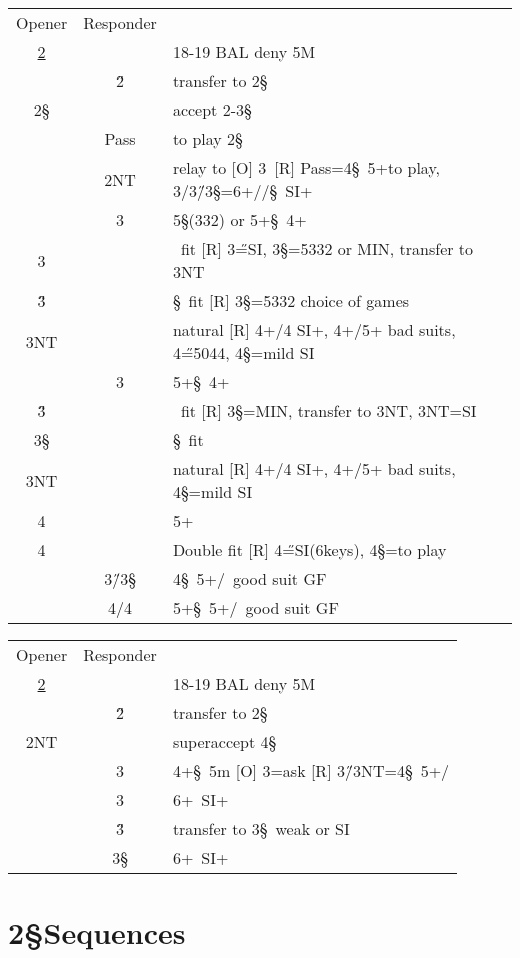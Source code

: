 \hypertarget{2d2h2s}{}
\begin{longtable}{C{\bidlength} C{\bidlength} | l}
Opener & Responder \\
\hyperlink{2d}{2\D} & & 18-19 BAL deny 5M \\
& 2\H & transfer to 2\S \\
2\S & & accept 2-3\S \\
\hline
\hline
& Pass& to play 2\S \\
& 2NT & relay to [O] 3\C\ [R] Pass=4\S\ 5+\C to play, 3\D/3\H/3\S=6+\D/\C/\S\ SI+ \\
& 3\C & 5\S(332) or 5+\S\ 4+\D \\
3\D & & \D\ fit [R] 3\H=SI, 3\S=5332 or MIN, transfer to 3NT \\
3\H & & \S\ fit [R] 3\S=5332 choice of games \\
3NT & & natural [R] 4+/4 SI+, 4+/5+ bad suits, 4\H=5044, 4\S=mild SI \\
& 3\D & 5+\S\ 4+\C \\
3\H & & \C\ fit [R] 3\S=MIN, transfer to 3NT, 3NT=SI \\
3\S & & \S\ fit \\
3NT & & natural [R] 4+/4 SI+, 4+/5+ bad suits, 4\S=mild SI \\
4\C & & 5+\C \\
4\D & & Double fit [R] 4\H=SI(6keys), 4\S=to play \\
& 3\H/3\S & 4\S\ 5+\C/\D\ good suit GF \\
& 4\C/4\D & 5+\S\ 5+\D/\C\ good suit GF \\
\end{longtable}

\hypertarget{2d2h2n}{}
\begin{longtable}{C{\bidlength} C{\bidlength} | l}
Opener & Responder \\
\hyperlink{2d}{2\D} & & 18-19 BAL deny 5M \\
& 2\H & transfer to 2\S \\
2NT &      & superaccept 4\S \\
\hline
\hline
& 3\C & 4+\S\ 5m [O] 3\D=ask [R] 3\H/3NT=4\S\ 5+\C/\D \\
& 3\D & 6+\D\ SI+ \\
& 3\H & transfer to 3\S\ weak or SI \\
& 3\S & 6+\C\ SI+ \\
\end{longtable}

\section{2\S Sequences}

